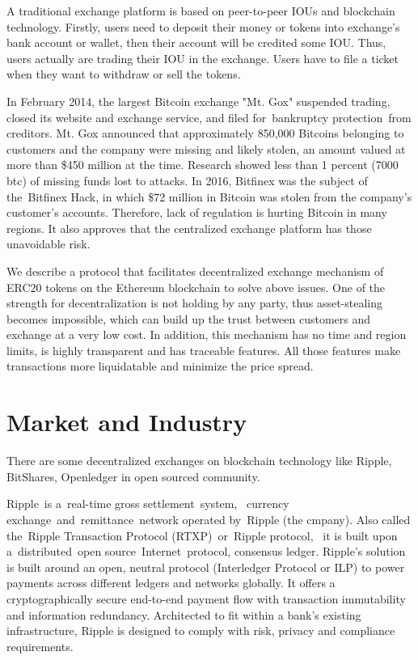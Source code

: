 \documentclass[UTF8,nofonts]{article}
\begin{document}
A traditional exchange platform is based on peer-to-peer IOUs and blockchain technology. Firstly,  users need to deposit their money or tokens into exchange's  bank account or wallet,  then their account will be credited some IOU. Thus,  users actually are trading their IOU in the exchange. Users have to file a ticket when they want to withdraw or sell the tokens.

In February 2014,  the largest Bitcoin exchange "Mt. Gox" suspended trading,  closed its website and exchange service,  and filed for bankruptcy protection from creditors\cite{mcmillan2014inside}. Mt. Gox announced that approximately 850,000 Bitcoins belonging to customers and the company were missing and likely stolen,  an amount valued at more than \$450 million at the time. Research showed less than 1 percent (7000 btc) of missing funds lost to attacks. In 2016,  Bitfinex was the subject of the Bitfinex Hack, in which \$72 million in Bitcoin was stolen from the company's customer's accounts. Therefore,  lack of regulation is hurting Bitcoin in many regions. It also approves that the centralized exchange platform has those unavoidable risk.

We describe a protocol that facilitates decentralized exchange mechanism of ERC20 tokens on the Ethereum blockchain to solve above issues. One of the strength for decentralization is not holding by any party,  thus asset-stealing becomes impossible, which can build up the trust between customers and exchange at a very low cost. In addition, this mechanism has no time and region limits, is highly transparent and has traceable features. All those features make transactions more liquidatable and minimize the price spread.

\section{Market and Industry\label{sec: existingworks}}

There are some decentralized exchanges on blockchain technology like Ripple,  BitShares,  Openledger in open sourced community.

Ripple\cite{schwartz2014ripple} is a real-time gross settlement system,  currency exchange and remittance network operated by Ripple (the cmpany). Also called the Ripple Transaction Protocol (RTXP) or Ripple protocol,  it is built upon a distributed open source Internet protocol,  consensus ledger. Ripple's solution is built around an open,  neutral protocol (Interledger Protocol or ILP\cite{thomas2015protocol}) to power payments across different ledgers and networks globally. It offers a cryptographically secure end-to-end payment flow with transaction immutability and information redundancy. Architected to fit within a bank's existing infrastructure,  Ripple is designed to comply with risk,  privacy and compliance requirements.
\end{document}
